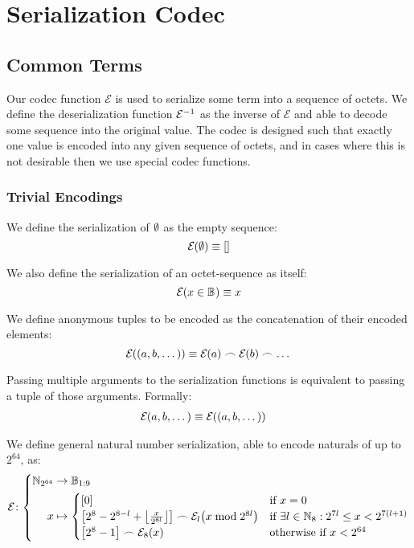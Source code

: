 \section{Serialization Codec}\label{sec:serialization}

\subsection{Common Terms}

Our codec function $\mathcal{E}$ is used to serialize some term into a sequence of octets. We define the deserialization function $\mathcal{E}^{-1}_{}$ as the inverse of $\mathcal{E}$ and able to decode some sequence into the original value. The codec is designed such that exactly one value is encoded into any given sequence of octets, and in cases where this is not desirable then we use special codec functions.

\subsubsection{Trivial Encodings}
We define the serialization of $\emptyset$ as the empty sequence:
\begin{equation}
  \encode{\none} \equiv \sq{}
\end{equation}

We also define the serialization of an octet-sequence as itself:
\begin{equation}
  \encode{x \in \blob} \equiv x
\end{equation}

We define anonymous tuples to be encoded as the concatenation of their encoded elements:
\begin{equation}
  \encode{\tup{a, b, \dots}} \equiv \encode{a} \concat \encode{b} \concat \dots
\end{equation}

Passing multiple arguments to the serialization functions is equivalent to passing a tuple of those arguments. Formally:
\begin{align}
  \encode{a, b, \dots} &\equiv \encode{\tup{a, b, \dots}}
\end{align}

We define general natural number serialization, able to encode naturals of up to $2^{64}$, as:
\begin{equation}
  \fnencode\colon\abracegroup{
    \Nbits{64} &\to \blob[1:9] \\
    x &\mapsto \begin{cases}
     \sq{0} &\when x = 0 \\
      \sq{2^8-2^{8-l} + \ffrac{x}{2^{8l}}} \concat \encode[l]{x \bmod 2^{8l}} &\when \exists l \in \N_8 : 2^{7l} \le x < 2^{7(l+1)} \\
     \sq{2^8-1} \concat \encode[8]{x} &\otherwhen x < 2^{64} \\
    \end{cases}
  }
\end{equation}

